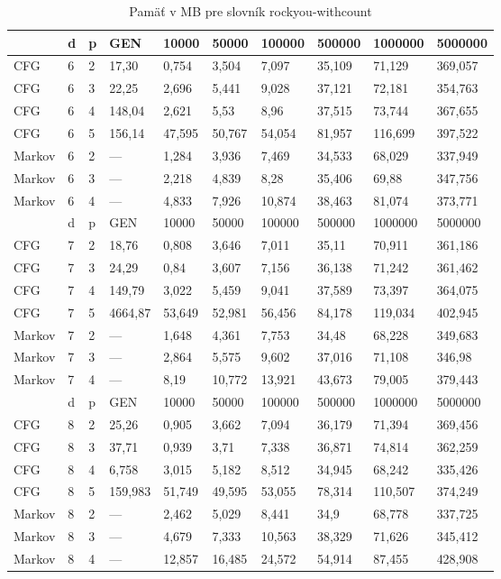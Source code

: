 \begin{table}[]
\centering
\caption{Pamäť v MB pre slovník rockyou-withcount}
\label{tbl:rockyouMemory}
\begin{tabular}{lll|lllllll}
       & d & p & GEN     & 10000  & 50000  & 100000 & 500000 & 1000000 & 5000000 \\ \hline
CFG    & 6 & 2 & 17,30   & 0,754  & 3,504  & 7,097  & 35,109 & 71,129  & 369,057 \\
CFG    & 6 & 3 & 22,25    & 2,696  & 5,441  & 9,028  & 37,121 & 72,181  & 354,763 \\
CFG    & 6 & 4 & 148,04   & 2,621  & 5,53   & 8,96   & 37,515 & 73,744  & 367,655 \\
CFG    & 6 & 5 & 156,14 & 47,595 & 50,767 & 54,054 & 81,957 & 116,699 & 397,522 \\
Markov & 6 & 2 & ---     & 1,284  & 3,936  & 7,469  & 34,533 & 68,029  & 337,949 \\
Markov & 6 & 3 & ---     & 2,218  & 4,839  & 8,28   & 35,406 & 69,88   & 347,756 \\
Markov & 6 & 4 & ---     & 4,833  & 7,926  & 10,874 & 38,463 & 81,074  & 373,771 \\ \hline
       & d & p & GEN     & 10000  & 50000  & 100000 & 500000 & 1000000 & 5000000 \\ \hline
CFG    & 7 & 2 & 18,76    & 0,808  & 3,646  & 7,011  & 35,11  & 70,911  & 361,186 \\
CFG    & 7 & 3 & 24,29   & 0,84   & 3,607  & 7,156  & 36,138 & 71,242  & 361,462 \\
CFG    & 7 & 4 & 149,79   & 3,022  & 5,459  & 9,041  & 37,589 & 73,397  & 364,075 \\
CFG    & 7 & 5 & 4664,87 & 53,649 & 52,981 & 56,456 & 84,178 & 119,034 & 402,945 \\
Markov & 7 & 2 & ---     & 1,648  & 4,361  & 7,753  & 34,48  & 68,228  & 349,683 \\
Markov & 7 & 3 & ---     & 2,864  & 5,575  & 9,602  & 37,016 & 71,108  & 346,98  \\
Markov & 7 & 4 & ---     & 8,19   & 10,772 & 13,921 & 43,673 & 79,005  & 379,443 \\ \hline
       & d & p & GEN     & 10000  & 50000  & 100000 & 500000 & 1000000 & 5000000 \\ \hline
CFG    & 8 & 2 & 25,26   & 0,905  & 3,662  & 7,094  & 36,179 & 71,394  & 369,456 \\
CFG    & 8 & 3 & 37,71   & 0,939  & 3,71   & 7,338  & 36,871 & 74,814  & 362,259 \\
CFG    & 8 & 4 & 6,758   & 3,015  & 5,182  & 8,512  & 34,945 & 68,242  & 335,426 \\
CFG    & 8 & 5 & 159,983 & 51,749 & 49,595 & 53,055 & 78,314 & 110,507 & 374,249 \\
Markov & 8 & 2 & ---     & 2,462  & 5,029  & 8,441  & 34,9   & 68,778  & 337,725 \\
Markov & 8 & 3 & ---     & 4,679  & 7,333  & 10,563 & 38,329 & 71,626  & 345,412 \\
Markov & 8 & 4 & ---     & 12,857 & 16,485 & 24,572 & 54,914 & 87,455  & 428,908
\end{tabular}
\end{table} 

